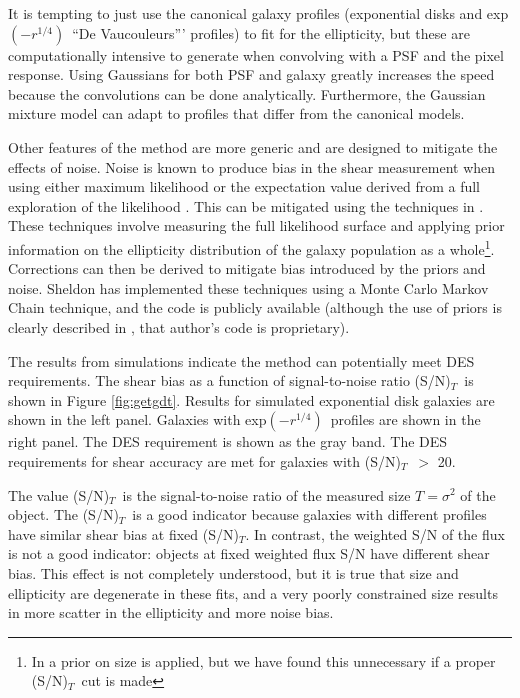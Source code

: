 \documentclass[12pt]{article}
\newcommand{\devauc}{De Vaucouleurs'}
\newcommand{\devprof}{exp$(-r^{1/4})$}
\newcommand{\sncut}{20}
\newcommand{\snsize}{(S/N)$_{T}$}
\begin{document}
It is tempting to just use the canonical galaxy profiles (exponential disks and
\devprof\ ``\devauc'' profiles) to fit for the ellipticity, but these are
computationally intensive to generate when convolving with a PSF and the pixel
response.  Using Gaussians for both PSF and galaxy greatly increases the speed
because the convolutions can be done analytically.   Furthermore, the Gaussian
mixture model can adapt to profiles that differ from the canonical models.

Other features of the method are more generic and are designed to mitigate the
effects of noise.  Noise is known to produce bias in the shear measurement when
using either maximum likelihood \cite{Refreg12} or the expectation value
derived from a full exploration of the likelihood \cite{Miller12}.  This can be
mitigated using the techniques in \cite{Miller07,Miller12}. These techniques
involve measuring the full likelihood surface and applying prior information on
the ellipticity distribution of the galaxy population as a whole\footnote{In
\cite{Miller12} a prior on size is applied, but we have found this unnecessary
if a proper \snsize\ cut is made}.
Corrections can then be derived to mitigate bias introduced by the priors and
noise.  Sheldon has implemented these techniques using a Monte Carlo Markov
Chain technique, and the code is publicly available (although the use of priors
is clearly described in \cite{Miller07}, that author's code is proprietary).

The results from simulations indicate the method can potentially meet DES
requirements.  The shear bias as a function of signal-to-noise ratio \snsize\
is shown in Figure \ref{fig:getgdt}.  Results for simulated exponential disk galaxies
are shown in the left panel.  Galaxies with \devprof\ profiles are shown in the
right panel.  The DES requirement is shown as the gray band.  The DES
requirements for shear accuracy are met for galaxies with \snsize\ $>$
\sncut.  

The value \snsize\ is the signal-to-noise ratio of the measured size
$T=\sigma^2$ of the object.  The \snsize\ is a good indicator because galaxies
with different profiles have similar shear bias at fixed \snsize.  In contrast,
the weighted S/N of the flux is not a good indicator: objects at fixed weighted
flux S/N have different shear bias.  This effect is not completely understood,
but it is true that size and ellipticity are degenerate in these fits, and a
very poorly constrained size results in more scatter in the ellipticity and
more noise bias.
\end{document}
